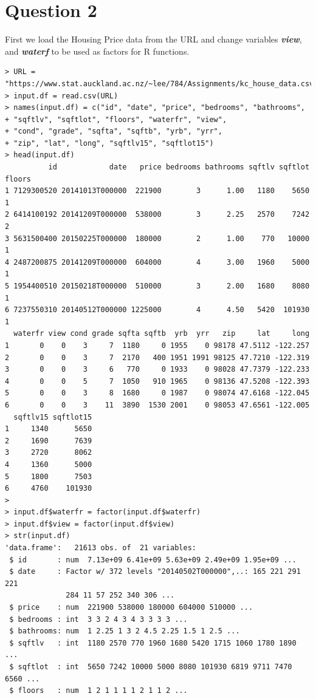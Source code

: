 \documentclass{article}%
\begin{document}
\section{Question 2}
First we load the Housing Price data from the URL and change variables \emph{\textbf{view}}, and \emph{\textbf{waterf}} to be used as factors for R functions.
\begin{verbatim}
> URL = "https://www.stat.auckland.ac.nz/~lee/784/Assignments/kc_house_data.csv"
> input.df = read.csv(URL)
> names(input.df) = c("id", "date", "price", "bedrooms", "bathrooms",
+ "sqftlv", "sqftlot", "floors", "waterfr", "view",
+ "cond", "grade", "sqfta", "sqftb", "yrb", "yrr",
+ "zip", "lat", "long", "sqftlv15", "sqftlot15")
> head(input.df)
          id            date   price bedrooms bathrooms sqftlv sqftlot floors
1 7129300520 20141013T000000  221900        3      1.00   1180    5650      1
2 6414100192 20141209T000000  538000        3      2.25   2570    7242      2
3 5631500400 20150225T000000  180000        2      1.00    770   10000      1
4 2487200875 20141209T000000  604000        4      3.00   1960    5000      1
5 1954400510 20150218T000000  510000        3      2.00   1680    8080      1
6 7237550310 20140512T000000 1225000        4      4.50   5420  101930      1
  waterfr view cond grade sqfta sqftb  yrb  yrr   zip     lat     long
1       0    0    3     7  1180     0 1955    0 98178 47.5112 -122.257
2       0    0    3     7  2170   400 1951 1991 98125 47.7210 -122.319
3       0    0    3     6   770     0 1933    0 98028 47.7379 -122.233
4       0    0    5     7  1050   910 1965    0 98136 47.5208 -122.393
5       0    0    3     8  1680     0 1987    0 98074 47.6168 -122.045
6       0    0    3    11  3890  1530 2001    0 98053 47.6561 -122.005
  sqftlv15 sqftlot15
1     1340      5650
2     1690      7639
3     2720      8062
4     1360      5000
5     1800      7503
6     4760    101930
>
> input.df$waterfr = factor(input.df$waterfr)
> input.df$view = factor(input.df$view)
> str(input.df)
'data.frame':   21613 obs. of  21 variables:
 $ id       : num  7.13e+09 6.41e+09 5.63e+09 2.49e+09 1.95e+09 ...
 $ date     : Factor w/ 372 levels "20140502T000000",..: 165 221 291 221 
              284 11 57 252 340 306 ...
 $ price    : num  221900 538000 180000 604000 510000 ...
 $ bedrooms : int  3 3 2 4 3 4 3 3 3 3 ...
 $ bathrooms: num  1 2.25 1 3 2 4.5 2.25 1.5 1 2.5 ...
 $ sqftlv   : int  1180 2570 770 1960 1680 5420 1715 1060 1780 1890 ...
 $ sqftlot  : int  5650 7242 10000 5000 8080 101930 6819 9711 7470 6560 ...
 $ floors   : num  1 2 1 1 1 1 2 1 1 2 ...

\end{verbatim}
\end{document}
